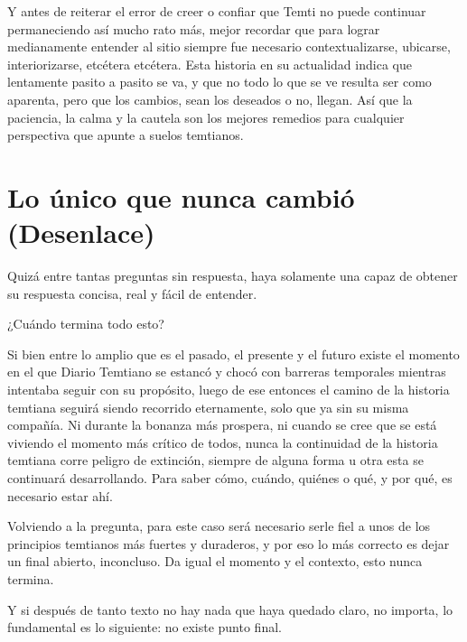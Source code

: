 \documentclass[
  spanish,
]{book}
\begin{document}
Y antes de reiterar el error de creer o confiar que Temti no puede continuar permaneciendo así mucho rato más, mejor recordar que para lograr medianamente entender al sitio siempre fue necesario contextualizarse, ubicarse, interiorizarse, etcétera etcétera. Esta historia en su actualidad indica que lentamente pasito a pasito se va, y que no todo lo que se ve resulta ser como aparenta, pero que los cambios, sean los deseados o no, llegan. Así que la paciencia, la calma y la cautela son los mejores remedios para cualquier perspectiva que apunte a suelos temtianos.

\hypertarget{lo-uxfanico-que-nunca-cambiuxf3-desenlace}{%
\chapter{Lo único que nunca cambió (Desenlace)}\label{lo-uxfanico-que-nunca-cambiuxf3-desenlace}}

Quizá entre tantas preguntas sin respuesta, haya solamente una capaz de obtener su respuesta concisa, real y fácil de entender.

¿Cuándo termina todo esto?

Si bien entre lo amplio que es el pasado, el presente y el futuro existe el momento en el que Diario Temtiano se estancó y chocó con barreras temporales mientras intentaba seguir con su propósito, luego de ese entonces el camino de la historia temtiana seguirá siendo recorrido eternamente, solo que ya sin su misma compañía. Ni durante la bonanza más prospera, ni cuando se cree que se está viviendo el momento más crítico de todos, nunca la continuidad de la historia temtiana corre peligro de extinción, siempre de alguna forma u otra esta se continuará desarrollando.
Para saber cómo, cuándo, quiénes o qué, y por qué, es necesario estar ahí.

Volviendo a la pregunta, para este caso será necesario serle fiel a unos de los principios temtianos más fuertes y duraderos, y por eso lo más correcto es dejar un final abierto, inconcluso. Da igual el momento y el contexto, esto nunca termina.

Y si después de tanto texto no hay nada que haya quedado claro, no importa, lo fundamental es lo siguiente: no existe punto final.
\end{document}

